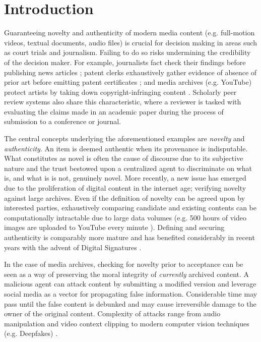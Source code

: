 \documentclass[conference]{IEEEtran}
\begin{document}
\section{Introduction}
Guaranteeing novelty and authenticity of modern media content (e.g. full-motion videos, textual documents, audio files) is crucial for decision making in areas such as court trials and journalism. Failing to do so risks undermining the credibility of the decision maker. For example, journalists fact check their findings before publishing news articles \cite{graves2016deciding}; patent clerks exhaustively gather evidence of absence of prior art before emitting patent certificates \cite{callaert2006traces}; and media archives (e.g. YouTube) protect artists by taking down copyright-infringing content \cite{o2006digital}. Scholarly peer review systems also share this characteristic, where a reviewer is tasked with evaluating the claims made in an academic paper during the process of submission to a conference or journal.

The central concepts underlying the aforementioned examples are \emph{novelty} and \emph{authenticity}. An item is deemed authentic when its provenance is indisputable. What constitutes as novel is often the cause of discourse due to its subjective nature and the trust bestowed upon a centralized agent to discriminate on what is, and what is is not, genuinely novel. More recently, a new issue has emerged due to the proliferation of digital content in the internet age; verifying novelty against large archives. Even if the definition of novelty can be agreed upon by interested parties, exhaustively comparing candidate and existing contents can be computationally intractable due to large data volumes (e.g. 500 hours of video images are uploaded to YouTube every minute \cite{robertson2015500}). Defining and securing authenticity is comparably more mature and has benefited considerably in recent years with the advent of Digital Signatures \cite{pointcheval2000security}.

In the case of media archives, checking for novelty prior to acceptance can be seen as a way of preserving the moral integrity of \emph{currently} archived content. A malicious agent can attack content by submitting a modified version and leverage social media as a vector for propagating false information. Considerable time may pass until the false content is debunked and may cause irreversible damage to the owner of the original content. Complexity of attacks range from audio manipulation and video context clipping to modern computer vision techniques (e.g. Deepfakes) \cite{chesney2018deep}. 
\end{document}

